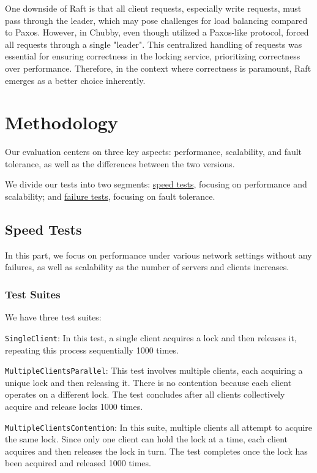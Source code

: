 \documentclass[11pt,a4paper]{article}
\begin{document}
One downside of Raft is that all client requests, especially write requests, must pass through the leader, which may pose challenges for load balancing compared to Paxos. However, in Chubby, even though utilized a Paxos-like protocol, forced all requests through a single "leader". This centralized handling of requests was essential for ensuring correctness in the locking service, prioritizing correctness over performance. Therefore, in the context where correctness is paramount, Raft emerges as a better choice inherently.

\section{Methodology}\label{sec3}
Our evaluation centers on three key aspects: performance, scalability, and fault tolerance, as well as the differences between the two versions.

We divide our tests into two segments: \hyperref[subsecSpeed]{speed tests}, focusing on performance and scalability; and \hyperref[subsecFailure]{failure tests}, focusing on fault tolerance.

\subsection{Speed Tests}\label{subsecSpeed}
In this part, we focus on performance under various network settings without any failures, as well as scalability as the number of servers and clients increases.
\subsubsection{Test Suites}\label{speedSuites}
We have three test suites:

\verb|SingleClient|: In this test, a single client acquires a lock and then releases it, repeating this process sequentially 1000 times.

\verb|MultipleClientsParallel|: This test involves multiple clients, each acquiring a unique lock and then releasing it. There is no contention because each client operates on a different lock. The test concludes after all clients collectively acquire and release locks 1000 times.

\verb|MultipleClientsContention|: In this suite, multiple clients all attempt to acquire the same lock. Since only one client can hold the lock at a time, each client acquires and then releases the lock in turn. The test completes once the lock has been acquired and released 1000 times.
\end{document}
